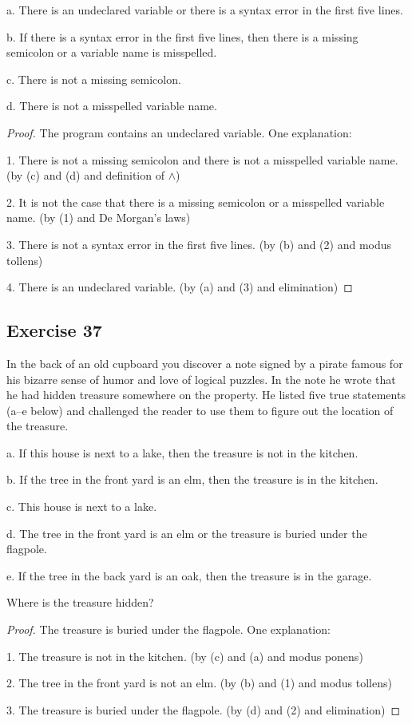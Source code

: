 \documentclass[14pt]{extarticle}
\begin{document}
a. There is an undeclared variable or there is a syntax error in the first five lines.

b. If there is a syntax error in the first five lines, then there is a missing semicolon or a variable name is misspelled.

c. There is not a missing semicolon.

d. There is not a misspelled variable name.

\begin{proof} 
The program contains an undeclared variable. One explanation:

1. There is not a missing semicolon and there is not a misspelled variable name. (by (c) and (d) and definition of $\wedge$)

2. It is not the case that there is a missing semicolon or a misspelled variable name. (by (1) and De Morgan’s laws)

3. There is not a syntax error in the first five lines. (by (b) and (2) and modus tollens)

4. There is an undeclared variable. (by (a) and (3) and elimination) 
\end{proof}

\subsection{Exercise 37} 
In the back of an old cupboard you discover a note signed by a pirate famous for his bizarre sense of humor and love of logical puzzles. In the note he wrote that he had hidden treasure somewhere on the property. He listed five true statements (a–e below) and challenged the reader to use them to figure out the location of the treasure.

a. If this house is next to a lake, then the treasure is not in the kitchen.

b. If the tree in the front yard is an elm, then the treasure is in the kitchen.

c. This house is next to a lake.

d. The tree in the front yard is an elm or the treasure is buried under the flagpole.

e. If the tree in the back yard is an oak, then the treasure is in the garage.

Where is the treasure hidden?

\begin{proof} 
The treasure is buried under the flagpole. One explanation:

1. The treasure is not in the kitchen. (by (c) and (a) and modus ponens)

2. The tree in the front yard is not an elm. (by (b) and (1) and modus tollens)

3. The treasure is buried under the flagpole. (by (d) and (2) and elimination)
\end{proof}
\end{document}
